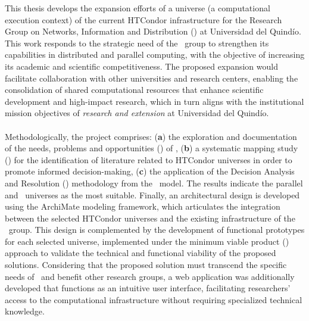 This thesis develops the expansion efforts of a universe (\ie a computational execution context) of the current HTCondor infrastructure for the Research Group on Networks, Information and Distribution (\GRID) at Universidad del Quindío. This work responds to the strategic need of the \GRID~group to strengthen its capabilities in distributed and parallel computing, with the objective of increasing its academic and scientific competitiveness. The proposed expansion would facilitate collaboration with other universities and research centers, enabling the consolidation of shared computational resources that enhance scientific development and high-impact research, which in turn aligns with the institutional mission objectives of \textit{research and extension} at Universidad del Quindío.
\\\\
Methodologically, the project comprises: (\textbf{a}) the exploration and documentation of the needs, problems and opportunities (\NPO) of \GRID, (\textbf{b}) a systematic mapping study (\SMS) for the identification of literature related to HTCondor universes in order to promote informed decision-making, (\textbf{c}) the application of the Decision Analysis and Resolution (\DAR) methodology from the \CMMI~model. The results indicate the parallel and \GRID~universes as the most suitable. Finally, an architectural design is developed using the ArchiMate modeling framework, which articulates the integration between the selected HTCondor universes and the existing infrastructure of the \GRID~group. This design is complemented by the development of functional prototypes for each selected universe, implemented under the minimum viable product (\PMV) approach to validate the technical and functional viability of the proposed solutions. Considering that the proposed solution must transcend the specific needs of \GRID~and benefit other research groups, a web application was additionally developed that functions as an intuitive user interface, facilitating researchers' access to the computational infrastructure without requiring specialized technical knowledge.